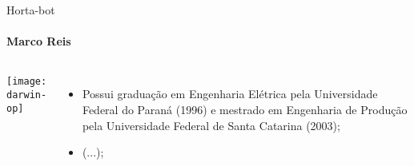 \begin{frame}[t]{Horta-bot}
    \transboxout[duration=0.5]
    \framesubtitle{Marco Reis}
    \begin{columns}
            \texttt{[image: darwin-op]}
            \begin{itemize}
                \justifying
                \item Possui graduação em Engenharia Elétrica pela Universidade Federal do Paraná (1996) e mestrado em Engenharia de Produção pela Universidade Federal de Santa Catarina (2003);
                \item (...);
            \end{itemize}
    \end{columns}
\end{frame}

